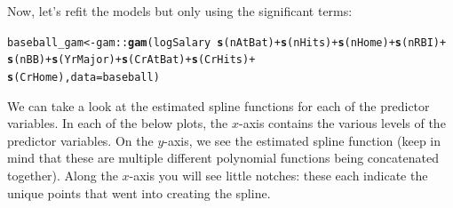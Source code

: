 \documentclass{article}\usepackage[]{graphicx}\usepackage[]{color}
\makeatletter
\newcommand{\hlopt}[1]{\textcolor[rgb]{0,0,0}{#1}}%
\newcommand{\hlstd}[1]{\textcolor[rgb]{0.345,0.345,0.345}{#1}}%
\newcommand{\hlkwb}[1]{\textcolor[rgb]{0.69,0.353,0.396}{#1}}%
\newcommand{\hlkwc}[1]{\textcolor[rgb]{0.333,0.667,0.333}{#1}}%
\newcommand{\hlkwd}[1]{\textcolor[rgb]{0.737,0.353,0.396}{\textbf{#1}}}%
\newenvironment{kframe}{%
 \def\at@end@of@kframe{}%
 \ifinner\ifhmode%
  \def\at@end@of@kframe{\end{minipage}}%
  \begin{minipage}{\columnwidth}%
 \fi\fi%
 \def\FrameCommand##1{\hskip\@totalleftmargin \hskip-\fboxsep
 \colorbox{shadecolor}{##1}\hskip-\fboxsep
     \hskip-\linewidth \hskip-\@totalleftmargin \hskip\columnwidth}%
 \MakeFramed {\advance\hsize-\width
   \@totalleftmargin\z@ \linewidth\hsize
   \@setminipage}}%
 {\par\unskip\endMakeFramed%
 \at@end@of@kframe}
\newenvironment{knitrout}{}{} %
\makeatother
\begin{document}
Now, let's refit the models but only using the significant terms:

\begin{knitrout}
\color{fgcolor}\begin{kframe}
\begin{alltt}
\hlstd{baseball_gam} \hlkwb{<-} \hlstd{gam}\hlopt{::}\hlkwd{gam}\hlstd{(logSalary} \hlopt{~} \hlkwd{s}\hlstd{(nAtBat)} \hlopt{+} \hlkwd{s}\hlstd{(nHits)} \hlopt{+} \hlkwd{s}\hlstd{(nHome)} \hlopt{+} \hlkwd{s}\hlstd{(nRBI)} \hlopt{+}
                           \hlkwd{s}\hlstd{(nBB)} \hlopt{+} \hlkwd{s}\hlstd{(YrMajor)} \hlopt{+} \hlkwd{s}\hlstd{(CrAtBat)} \hlopt{+} \hlkwd{s}\hlstd{(CrHits)} \hlopt{+}
                           \hlkwd{s}\hlstd{(CrHome),} \hlkwc{data} \hlstd{= baseball)}
\end{alltt}
\end{kframe}
\end{knitrout}

We can take a look at the estimated spline functions for each of the predictor variables. In each of the below plots, the $x$-axis contains the various levels of the predictor variables. On the $y$-axis, we see the estimated spline function (keep in mind that these are multiple different polynomial functions being concatenated together). Along the $x$-axis you will see little notches: these each indicate the unique points that went into creating the spline.
\end{document}
